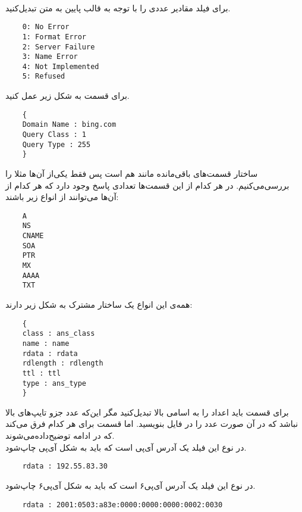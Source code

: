 \documentclass{article}
\begin{document}
    \\
    برای فیلد
    مقادیر عددی را با توجه به قالب پایین به متن تبدیل‌کنید.
    \begin{LTR}
    \begin{verbatim}
    0: No Error
    1: Format Error
    2: Server Failure
    3: Name Error
    4: Not Implemented
    5: Refused
    \end{verbatim}
    \end{LTR}	
    برای قسمت 
    به شکل زیر عمل کنید.
    \begin{LTR}
    \begin{verbatim}
    {
    Domain Name : bing.com
    Query Class : 1
    Query Type : 255
    }
    \end{verbatim}
    \end{LTR}
    ساختار قسمت‌های با‌قی‌مانده مانند هم است  پس فقط یکی‌از آن‌ها مثلا 
    را بررسی‌می‌کنیم.
    در هر کدام از این قسمت‌ها تعدادی پاسخ وجود دارد که هر کدام از آن‌ها می‌توانند از انواع زیر باشند:
    \begin{LTR}
    \begin{verbatim}
    A
    NS
    CNAME
    SOA
    PTR
    MX
    AAAA
    TXT
    \end{verbatim}
    \end{LTR}
    همه‌ی این انواع یک ساختار مشترک به شکل زیر دارند:
    \begin{LTR}
    \begin{verbatim}
    {
    class : ans_class
    name : name
    rdata : rdata
    rdlength : rdlength
    ttl : ttl
    type : ans_type
    }    
    \end{verbatim}
    \end{LTR}
    برای قسمت 
    باید اعداد را به اسامی بالا تبدیل‌کنید مگر این‌که عدد جزو تایپ‌های بالا نباشد که در آن صورت عدد را در فایل بنویسید.
    اما قسمت 
    برای هر کدام فرق می‌کند که در ادامه‌ توضیح‌داده‌می‌شوند.
    \\
    در نوع
    این فیلد یک آدرس آی‌پی است که باید به شکل آی‌پی چاپ‌شود.
    \begin{LTR}
    \begin{verbatim}
    rdata : 192.55.83.30
    \end{verbatim}
    \end{LTR}
    در نوع
    این فیلد یک آدرس آی‌پی۶ است که باید به شکل آی‌پی۶ چاپ‌شود.
    \begin{LTR}
    \begin{verbatim}
    rdata : 2001:0503:a83e:0000:0000:0000:0002:0030
    \end{verbatim}
    \end{LTR}
\end{document}
